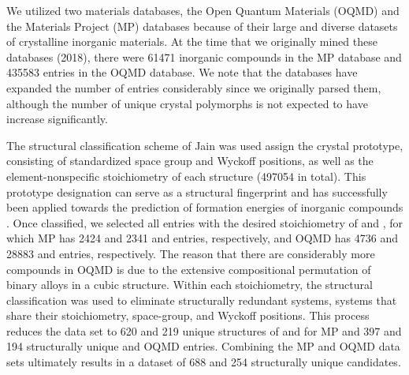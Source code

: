 %
We utilized two materials databases, the Open Quantum Materials (OQMD) and the Materials Project (MP) databases because of their large and diverse datasets of crystalline inorganic materials.
%
At the time that we originally mined these databases (2018), there were \num{61471} inorganic compounds in the MP database and \num{435583} entries in the OQMD database.
%
We note that the databases have expanded the number of entries considerably since we originally parsed them,
although the number of unique crystal polymorphs is not expected to have increase significantly.


%
%
The structural classification scheme of Jain  was used assign the crystal prototype, consisting of standardized space group and Wyckoff positions, as well as the element-nonspecific stoichiometry of each structure (\num{497054} in total). This prototype designation can serve as a structural fingerprint and has successfully been applied towards the prediction of formation energies of inorganic compounds \cite{Jain2018}.
%
%
Once classified, we selected all entries with the desired stoichiometry of \ABtwo and \ABthree,
for which MP has \num{2424} and \num{2341} \ABtwo and \ABthree entries, respectively,
and OQMD has \num{4736} and \num{28883} \ABtwo and \ABthree entries, respectively.
%
The reason that there are considerably more \ABthree compounds in OQMD is due to the extensive compositional permutation of binary alloys in a cubic \ABthree structure.
%
Within each stoichiometry, the structural classification was used to eliminate structurally redundant systems,
 systems that share their stoichiometry, space-group, and Wyckoff positions.
%
This process reduces the data set to \num{620} and \num{219} unique structures of \ABtwo and \ABthree for MP and \num{397} and \num{194} structurally unique \ABtwo and \ABthree OQMD entries.
%
Combining the MP and OQMD data sets ultimately results in a dataset of \num{688} \ABtwo and \num{254} \ABthree structurally unique candidates.


